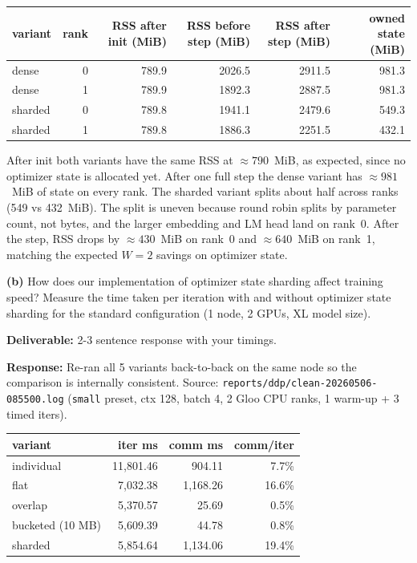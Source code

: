 \documentclass[11pt]{article}
\begin{document}
\begin{table}[H]
\centering\small
\begin{tabular}{lrrrrr}
\toprule
variant & rank & RSS after init (MiB) & RSS before step (MiB) & RSS after step (MiB) & owned state (MiB) \\
\midrule
dense    & 0 & 789.9 & 2026.5 & 2911.5 &  981.3 \\
dense    & 1 & 789.9 & 1892.3 & 2887.5 &  981.3 \\
sharded  & 0 & 789.8 & 1941.1 & 2479.6 &  549.3 \\
sharded  & 1 & 789.8 & 1886.3 & 2251.5 &  432.1 \\
\bottomrule
\end{tabular}
\end{table}

\noindent After init both variants have the same RSS at $\approx 790$~MiB, as expected, since no optimizer state is allocated yet. After one full step the dense variant has $\approx 981$~MiB of state on every rank. The sharded variant splits about half across ranks (549 vs 432~MiB). The split is uneven because round robin splits by parameter count, not bytes, and the larger embedding and LM head land on rank~0. After the step, RSS drops by $\approx 430$~MiB on rank~0 and $\approx 640$~MiB on rank~1, matching the expected $W=2$ savings on optimizer state.

\vspace{0.25cm}
\textbf{(b)} How does our implementation of optimizer state sharding affect training speed? Measure the time taken per iteration with and without optimizer state sharding for the standard configuration (1 node, 2 GPUs, XL model size).

\textbf{Deliverable:} 2-3 sentence response with your timings.

\vspace{0.25cm}
\textbf{Response:}
Re-ran all 5 variants back-to-back on the same node so the comparison is internally consistent. Source: \verb|reports/ddp/clean-20260506-085500.log| (\texttt{small} preset, ctx 128, batch 4, 2 Gloo CPU ranks, 1 warm-up + 3 timed iters).

\begin{table}[H]
\centering\small
\begin{tabular}{lrrr}
\toprule
variant & iter ms & comm ms & comm/iter \\
\midrule
individual          & 11{,}801.46 & 904.11 & 7.7\% \\
flat                &  7{,}032.38 & 1{,}168.26 & 16.6\% \\
overlap             &  5{,}370.57 &     25.69 & 0.5\% \\
bucketed (10 MB)    &  5{,}609.39 &     44.78 & 0.8\% \\
sharded             &  5{,}854.64 & 1{,}134.06 & 19.4\% \\
\bottomrule
\end{tabular}
\end{table}
\end{document}
